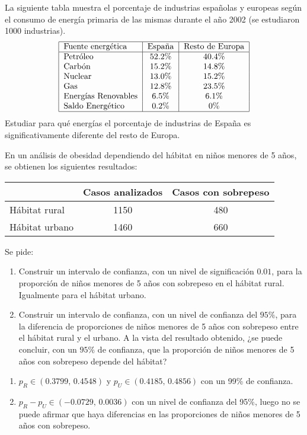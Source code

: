{La siguiente tabla muestra el porcentaje de industrias españolas y europeas según el consumo de energía primaria de
las mismas durante el año 2002 (se estudiaron 1000 industrias).
\[
\begin{tabular}{|l|c|c|}
\hline
Fuente energética  &  España  & Resto de Europa \\
\hline
Petróleo            & $52.2$\% &    $40.4$\%     \\
Carbón              & $15.2$\% &    $14.8$\%     \\
Nuclear             & $13.0$\% &    $15.2$\%     \\
Gas                 & $12.8$\% &    $23.5$\%     \\
Energías Renovables & $6.5$\%  &     $6.1$\%     \\
Saldo Energético    & $0.2$\%  &       0\%       \\
\hline
\end{tabular}
\]
Estudiar para qué energías el porcentaje de industrias de España es significativamente diferente del resto de Europa.
}
{}
{}


{En un análisis de obesidad dependiendo del hábitat en niños menores de 5 años, se obtienen los siguientes resultados:
\begin{center}
\begin{tabular}{|l|c|c|}
\cline{2-3}
\multicolumn{1}{l|}{} & Casos analizados & Casos con sobrepeso \\
\hline
Hábitat rural & 1150 & 480 \\
\hline
Hábitat urbano & 1460 & 660 \\
\hline
\end{tabular}
\end{center}
Se pide:

\begin{enumerate}
\item  Construir un intervalo de confianza, con un nivel de significación $0.01$, para la proporción de niños menores
de 5 años con sobrepeso en el hábitat rural. Igualmente para el hábitat urbano.
\item Construir un intervalo de confianza, con un nivel de confianza del $95\%$, para la diferencia de proporciones de
niños menores de 5 años con sobrepeso entre el hábitat rural y el urbano.
A la vista del resultado obtenido, ¿se puede concluir, con un $95\%$ de confianza, que la proporción de niños menores
de 5 años con sobrepeso depende del hábitat?
\end{enumerate}
}
{
\begin{enumerate}
\item $p_R \in (0.3799,\,0.4548)$ y $p_U\in (0.4185,\,0.4856)$ con un 99\% de confianza.
\item $p_R-p_U\in (-0.0729,\,0.0036)$ con un nivel de confianza del 95\%, luego no se puede afirmar que haya
diferencias en las proporciones de niños menores de 5 años con sobrepeso.
\end{enumerate}
}
{}


